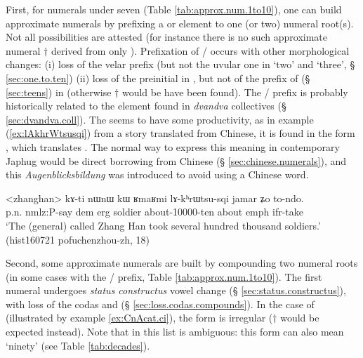 First, for numerals under seven (Table \ref{tab:approx.num.1to10}), one can build approximate numerals by prefixing a  or  element to one (or two) numeral root(s). Not all possibilities are attested (for instance there is no such approximate numeral $\dagger$ derived from only ).  Prefixation of  /  occurs with other morphological changes: (i) loss of the velar  prefix (but not the uvular one in `two' and `three', § \ref{sec:one.to.ten}) (ii) loss of the  preinitial in  , but not of the  prefix of  (§ \ref{sec:teens}) in  (otherwise $\dagger$ would be have been found). The  /  prefix is probably historically related to the  element found in \textit{dvandva} collectives (§ \ref{sec:dvandva.coll}).  The  seems to have some productivity, as in example (\ref{ex:lAkhrWtsusqi}) from a story translated from Chinese, it is found in the form , which translates . The normal way to express this meaning in contemporary Japhug would be direct borrowing from Chinese (§ \ref{sec:chinese.numerals}), and this \textit{Augenblicksbildung} was introduced to avoid using a Chinese word.

\begin{exe}
\ex \label{ex:lAkhrWtsusqi} 
\gll <zhanghan> kɤ-ti nɯnɯ kɯ ʁmaʁmi lɤ-kʰrɯtsu-sqi jamar ʑo to-ndo. \\
p.n. nmlz:P-say dem erg soldier about-10000-ten about emph ifr-take \\
\glt `The (general) called Zhang Han took several hundred thousand soldiers.' (hist160721 pofuchenzhou-zh, 18)
\end{exe}

Second, some approximate numerals are built by compounding two numeral roots (in some cases with the   /  prefix, Table \ref{tab:approx.num.1to10}). The first numeral undergoes \textit{status constructus} vowel change (§ \ref{sec:status.constructus}), with loss of the codas  and  (§ \ref{sec:loss.codas.compounds}). In the case of  (illustrated by example \ref{ex:CnAcat.ci}), the form  is irregular ($\dagger$ would be expected instead). Note that in this list  is ambiguous: this form can also mean `ninety' (see Table \ref{tab:decades}).

